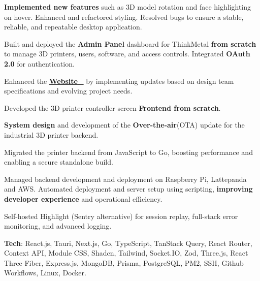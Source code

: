 \documentclass[letterpaper,11pt]{article}
\newcommand{\resumeItem}[1]{
  \item\small{
    {#1 \vspace{-2pt}}
  }
}
\begin{document}
      
      \resumeItem{ \textbf{Implemented new features} such as 3D  model rotation and face highlighting on hover. Enhanced and refactored styling. Resolved bugs to ensure a stable, reliable, and repeatable desktop application.}
      
      \resumeItem{Built and deployed the \textbf{Admin Panel} dashboard for ThinkMetal \textbf{from scratch} to manage 3D printers, users, software, and access controls. Integrated \textbf{OAuth 2.0} for authentication.}
      
      \resumeItem{Enhanced the {\href{https://thinkmetal.in}{{\textbf{Website}}{
     \small \raisebox{-0.1\height}\faExternalLink\
     }}} by implementing updates based on design team specifications and evolving project needs.}
     
     \resumeItem{Developed the 3D printer controller screen \textbf{Frontend from scratch}.}

     \resumeItem{\textbf{System design} and development of the \textbf{Over-the-air}(OTA) update for the industrial 3D printer backend.  }

     \resumeItem{Migrated the printer backend from JavaScript to Go, boosting performance and enabling a secure standalone build.
}
     
     \resumeItem{Managed backend development and deployment on Raspberry Pi, Lattepanda and AWS. Automated deployment and server setup using scripting, \textbf{improving developer experience} and operational efficiency.}

    \resumeItem{Self-hosted Highlight (Sentry alternative) for session replay, full-stack error monitoring, and advanced logging.}

    \resumeItem{\textbf{Tech}: React.js, Tauri, Next.js, Go, TypeScript, TanStack Query, React Router, Context API, Module CSS, Shadcn, Tailwind, Socket.IO, Zod, Three.js, React Three Fiber, Express.js, MongoDB, Prisma, PostgreSQL, PM2, SSH, Github Workflows, Linux, Docker.}


      

      
      
\end{document}
